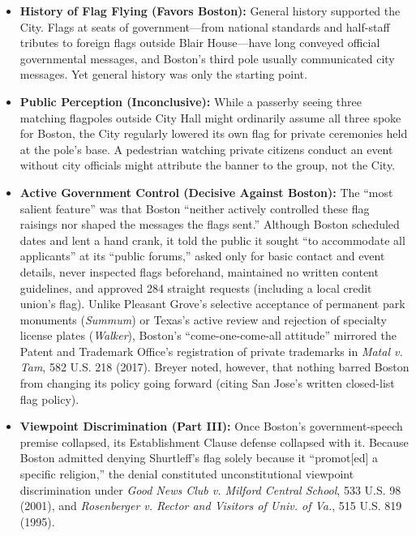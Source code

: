 \documentclass[12pt]{article}
\begin{document}
\begin{itemize}
  \item \textbf{History of Flag Flying (Favors Boston):} General history supported the City. Flags at seats of government---from national standards and half-staff tributes to foreign flags outside Blair House---have long conveyed official governmental messages, and Boston's third pole usually communicated city messages. Yet general history was only the starting point.
  \item \textbf{Public Perception (Inconclusive):} While a passerby seeing three matching flagpoles outside City Hall might ordinarily assume all three spoke for Boston, the City regularly lowered its own flag for private ceremonies held at the pole's base. A pedestrian watching private citizens conduct an event without city officials might attribute the banner to the group, not the City.
  \item \textbf{Active Government Control (Decisive Against Boston):} The ``most salient feature'' was that Boston ``neither actively controlled these flag raisings nor shaped the messages the flags sent.'' Although Boston scheduled dates and lent a hand crank, it told the public it sought ``to accommodate all applicants'' at its ``public forums,'' asked only for basic contact and event details, never inspected flags beforehand, maintained no written content guidelines, and approved 284 straight requests (including a local credit union's flag). Unlike Pleasant Grove's selective acceptance of permanent park monuments (\textit{Summum}) or Texas's active review and rejection of specialty license plates (\textit{Walker}), Boston's ``come-one-come-all attitude'' mirrored the Patent and Trademark Office's registration of private trademarks in \textit{Matal v. Tam}, 582 U.S. 218 (2017). Breyer noted, however, that nothing barred Boston from changing its policy going forward (citing San Jose's written closed-list flag policy).
  \item \textbf{Viewpoint Discrimination (Part III):} Once Boston's government-speech premise collapsed, its Establishment Clause defense collapsed with it. Because Boston admitted denying Shurtleff's flag solely because it ``promot[ed] a specific religion,'' the denial constituted unconstitutional viewpoint discrimination under \textit{Good News Club v. Milford Central School}, 533 U.S. 98 (2001), and \textit{Rosenberger v. Rector and Visitors of Univ. of Va.}, 515 U.S. 819 (1995).
\end{itemize}
\end{document}
